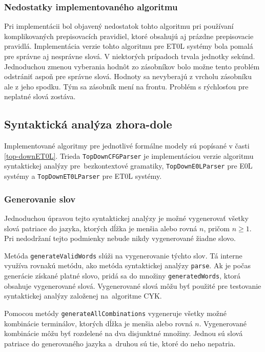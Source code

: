 \subsubsection*{Nedostatky implementovaného algoritmu}
Pri implementácii bol objavený nedostatok tohto algoritmu pri používaní komplikovaných prepisovacích pravidiel, ktoré obsahujú aj prázdne prepisovacie pravidlá. Implementácia verzie tohto algoritmu pre ET0L systémy bola pomalá pre správne aj nesprávne slová. V niektorých prípadoch trvala jednotky sekúnd. Jednoduchou zmenou vyberania hodnôt zo zásobníkov bolo možne tento problém odstrániť aspoň pre správne slová. Hodnoty sa nevyberajú z vrcholu zásobníku ale z jeho spodku. Tým sa zásobník mení na frontu. Problém s rýchlosťou pre neplatné slová zostáva.

\subsection{Syntaktická analýza zhora-dole}
\label{topDownImplementation}
Implementované algoritmy pre jednotlivé formálne modely sú popísané v časti \ref{top-downET0L}. Trieda \texttt{TopDownCFGParser} je implementáciou verzie algoritmu syntaktickej analýzy pre~bezkontextové gramatiky, \texttt{TopDownE0LParser} pre E0L systémy a \texttt{TopDownET0LParser} pre ET0L systémy.


\subsubsection*{Generovanie slov}
Jednoduchou úpravou tejto syntaktickej analýzy je možné vygenerovať všetky slová patriace do jazyka, ktorých dĺžka je menšia alebo rovná $n$, pričom $n \geq 1$. Pri nedodržaní tejto podmienky nebude nikdy vygenerované žiadne slovo.

Metóda \texttt{generateValidWords} slúži na vygenerovanie týchto slov. Tá interne využíva rovnakú metódu, ako metóda syntaktickej analýzy \texttt{parse}. Ak je počas generácie získané platné slovo, pridá sa do množiny \texttt{generatedWords}, ktorá obsahuje vygenerované slová. Vygenerované slová môžu byť použité pre testovanie syntaktickej analýzy založenej na~algoritme CYK.

Pomocou metódy \texttt{generateAllCombinations} vygeneruje všetky možné kombinácie terminálov, ktorých dĺžka je menšia alebo rovná $n$. Vygenerované kombinácie môžu byť rozdelené na dva disjunktné množiny. Jednou sú slová patriace do generovaného jazyka a~druhou sú tie, ktoré do neho nepatria.

